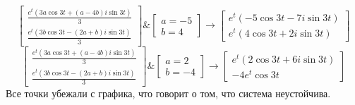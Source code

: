 \documentclass[a3paper,14pt]{extarticle}
\begin{document}
$$\begin{bmatrix}
    \frac{e^t(3a\cos{3t}+(a-4b)i\sin{3t})}{3} \\
    \frac{e^t(3b\cos{3t}-(2a+b)i\sin{3t})}{3}
\end{bmatrix} \& \begin{bmatrix}
    a=-5 \\b= 4
\end{bmatrix} \rightarrow \begin{bmatrix}
    e^t(-5\cos{3t}-7i\sin{3t}) \\
    e^t(4\cos{3t}+2i\sin{3t})
\end{bmatrix}$$
$$\begin{bmatrix}
    \frac{e^t(3a\cos{3t}+(a-4b)i\sin{3t})}{3} \\
    \frac{e^t(3b\cos{3t}-(2a+b)i\sin{3t})}{3}
\end{bmatrix} \& \begin{bmatrix}
    a=2 \\ b=-4
\end{bmatrix} \rightarrow \begin{bmatrix}
    e^t(2\cos{3t}+6i\sin{3t}) \\
    -4e^t\cos{3t}
\end{bmatrix}$$
Все точки убежали с графика, что говорит о том, что система неустойчива.
\end{document}
